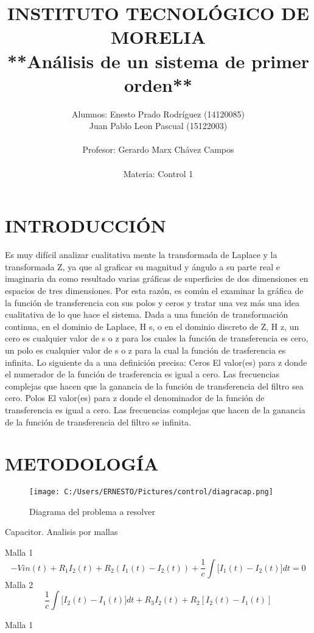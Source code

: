 \documentclass{article}
\title{INSTITUTO TECNOLÓGICO DE MORELIA\\ **Análisis de un sistema de primer orden**}
\author{Alumnos: Enesto Prado Rodríguez (14120085)\\Juan Pablo Leon Pascual (15122003) \\ \\ Profesor: Gerardo Marx Chávez Campos \\ \\ Materia: Control 1}
\begin{document}
	\maketitle
	\newpage\section{INTRODUCCIÓN}
	Es muy difícil analizar cualitativa mente la transformada de Laplace y la transformada Z, ya que al graficar su magnitud y ángulo a su parte real e imaginaria da como resultado varias gráficas de superficies de dos dimensiones en espacios de tres dimensiones. Por esta razón, es común el examinar la gráfica de la función de transferencia con sus polos y ceros y tratar una vez más una idea cualitativa de lo que hace el sistema.
	Dada a una función de transformación continua, en el dominio de Laplace, H s, o en el dominio discreto de Z, H z, un cero es cualquier valor de s o z para los cuales la función de transferencia es cero, un polo es cualquier valor de s o z para la cual la función de trasferencia es infinita. Lo siguiente da a una definición precisa:
	Ceros
	El valor(es) para z donde el numerador de la función de trasferencia es igual a cero. Las frecuencias complejas que hacen que la ganancia de la función de transferencia del filtro sea cero.
	Polos
	El valor(es) para z donde el denominador de la función de transferencia es igual a cero. Las frecuencias complejas que hacen de la ganancia de la función de transferencia del filtro se infinita.
	
\newpage\section{METODOLOGÍA}

\begin{figure}[h!]
	\centering
	\texttt{[image: C:/Users/ERNESTO/Pictures/control/diagracap.png]}
	\caption{Diagrama del problema a resolver}
\end{figure}
Capacitor. Analisis por mallas

Malla 1
\begin{equation}
-Vin(t)+R_{1}I_{2}(t)+R_{2}(I_{1}(t)-I_{2}(t))+\frac{1}{c}\int{[I_{1}(t)-I_{2}(t)}]dt=0
\end{equation}
Malla 2
\begin{equation}
\frac{1}{c}\int{[I_{2}(t)-I_{1}(t)}]dt+R_{3}I_{2}(t)+R_{2}[I_{2}(t)-I_{1}(t)]
\end{equation}


Malla 1 
\end{document}
